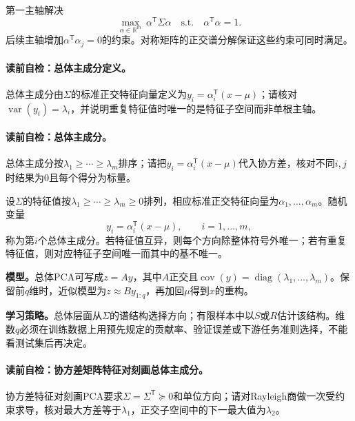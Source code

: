 第一主轴解决
\[
\max_{\alpha\in\mathbb R^m}\ \alpha^{\mathsf T}\Sigma\alpha
\quad\text{s.t.}\quad \alpha^{\mathsf T}\alpha=1.
\]
后续主轴增加$\alpha^{\mathsf T}\alpha_j=0$的约束。对称矩阵的正交谱分解保证这些约束可同时满足。

\paragraph{读前自检：总体主成分定义。}总体主成分由$\Sigma$的标准正交特征向量定义为$y_i=\alpha_i^{\mathsf T}(x-\mu)$；请核对$\operatorname{var}(y_i)=\lambda_i$，并说明重复特征值时唯一的是特征子空间而非单根主轴。\par

\label{struct:V4-C04-CH07}
\paragraph{读前自检：总体主成分。}总体主成分按$\lambda_1\ge\cdots\ge\lambda_m$排序；请把$y_i=\alpha_i^{\mathsf T}(x-\mu)$代入协方差，核对不同$i,j$时结果为0且每个得分为标量。\par

\begin{definition}[总体主成分]
设$\Sigma$的特征值按$\lambda_1\ge\cdots\ge\lambda_m\ge0$排列，相应标准正交特征向量为$\alpha_1,\ldots,\alpha_m$。随机变量
\[
y_i=\alpha_i^{\mathsf T}(x-\mu),\qquad i=1,\ldots,m,
\]
称为第$i$个总体主成分。若特征值互异，则每个方向除整体符号外唯一；若有重复特征值，则对应特征子空间唯一而其中的基不唯一。
\end{definition}

\label{struct:V4-C04-CH08}
\textbf{模型。}总体PCA可写成$z=Ay$，其中$A$正交且$\operatorname{cov}(y)=\operatorname{diag}(\lambda_1,\ldots,\lambda_m)$。保留前$q$维时，近似模型为$z\approx B y_{1:q}$，再加回$\mu$得到$x$的重构。

\label{struct:V4-C04-CH09}
\textbf{学习策略。}总体层面从$\Sigma$的谱结构选择方向；有限样本中以$S$或$R$估计该结构。维数$q$必须在训练数据上用预先规定的贡献率、验证误差或下游任务准则选择，不能看测试集后再决定。


\paragraph{读前自检：协方差矩阵特征对刻画总体主成分。}协方差特征对刻画PCA要求$\Sigma=\Sigma^{\mathsf T}\succeq0$和单位方向；请对Rayleigh商做一次受约束求导，核对最大方差等于$\lambda_1$，正交子空间中的下一最大值为$\lambda_2$。\par

